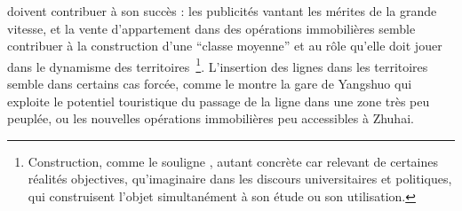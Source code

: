 {doivent contribuer à son succès : les publicités vantant les mérites de la grande vitesse, et la vente d'appartement dans des opérations immobilières semble contribuer à la construction d'une ``classe moyenne'' et au rôle qu'elle doit jouer dans le dynamisme des territoires~\cite{rocca2008power}\footnote{Construction, comme le souligne , autant concrète car relevant de certaines réalités objectives, qu'imaginaire dans les discours universitaires et politiques, qui construisent l'objet simultanément à son étude ou son utilisation.}. L'insertion des lignes dans les territoires semble dans certains cas forcée, comme le montre la gare de Yangshuo qui exploite le potentiel touristique du passage de la ligne dans une zone très peu peuplée, ou les nouvelles opérations immobilières peu accessibles à Zhuhai.
}



